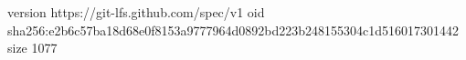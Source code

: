 version https://git-lfs.github.com/spec/v1
oid sha256:e2b6c57ba18d68e0f8153a9777964d0892bd223b248155304c1d516017301442
size 1077
